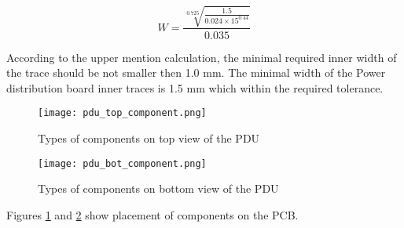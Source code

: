 \begin{equation}
W = \frac{\sqrt[0.725]{\frac{1.5}{0.024 \times 15^{0.44}}}}{0.035}
\end{equation} 

According to the upper mention calculation, the minimal required inner width of the trace should be not smaller then 1.0 mm. The minimal width of the Power distribution board inner traces is 1.5 mm which within the required tolerance. 



\begin{figure}[h]
	\centering
	\texttt{[image: pdu\_top\_component.png]}
	\caption{Types of components on  top view of the PDU }
	\label{fig: pdu_comp_top}
\end{figure} 

\begin{figure}[h]
	\centering
	\texttt{[image: pdu\_bot\_component.png]}
	\caption{Types of components on  bottom view of the PDU}
	\label{fig: pdu_comp_bot}
\end{figure} 


Figures \ref{fig: pdu_comp_top} and \ref{fig: pdu_comp_bot} show placement of components on the PCB.
 


